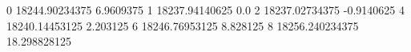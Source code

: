 0 18244.90234375 6.9609375
1 18237.94140625 0.0
2 18237.02734375 -0.9140625
4 18240.14453125 2.203125
6 18246.76953125 8.828125
8 18256.240234375 18.298828125
